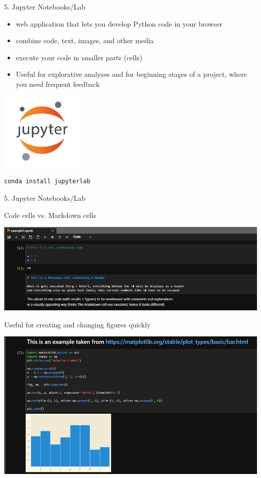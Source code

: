 \begin{vbframe}{5. Jupyter Notebooks/Lab}

\vfill

\begin{itemize}
	\item web application that lets you develop Python code in your browser
	\item combine code, text, images, and other media
	\item execute your code in smaller parts (cells)
	\item Useful for explorative analyses and for beginning stages of a project, where you need frequent feedback
\end{itemize}

\centering
\includegraphics[width=0.3\textwidth]{figure/jupyter.jpg}

\begin{lstlisting}[language=bash]
conda install jupyterlab
\end{lstlisting}

\vfill

\end{vbframe}


\begin{vbframe}{5. Jupyter Notebooks/Lab}

\vfill

Code cells vs. Markdown cells

\vspace{.2cm}


\includegraphics[width=.6\textwidth]{figure/jupyter1.png}

Useful for creating and changing figures quickly

\vspace{.2cm}

\includegraphics[width=.6\textwidth]{figure/jupyter2.png}

\vfill

\end{vbframe}


